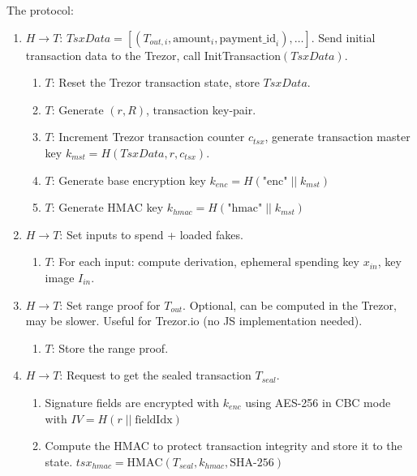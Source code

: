 \documentclass[]{article}
\begin{document}
\noindent The protocol:
\begin{enumerate}
	\item $H \rightarrow T$: $TsxData = \left[\left(T_{out,i}, \text{amount}_i, \text{payment\_id}_i\right), \dots \right]$. Send initial transaction data to the Trezor, call InitTransaction$\left(TsxData\right)$.
	
	\begin{enumerate}
		\item $T$: Reset the Trezor transaction state, store $TsxData$.
		
		\item $T$: Generate $(r, R)$, transaction key-pair.
		
		\item $T$: Increment Trezor transaction counter $c_{tsx}$, generate transaction master key $k_{mst} = H(TsxData, r, c_{tsx})$.
		
		\item $T$: Generate base encryption key $k_{enc} = H\left(\text{"enc"} \; || \; k_{mst}\right)$
		
		\item $T$: Generate HMAC key $k_{hmac} = H\left(\text{"hmac"} \; || \; k_{mst}\right)$
	\end{enumerate}
	
	\item $H \rightarrow T$: Set inputs to spend + loaded fakes.
	\begin{enumerate}
		\item $T$: For each input: compute derivation, ephemeral spending key $x_{in}$, key image $I_{in}$.
	\end{enumerate}
	
	\item $H \rightarrow T$: Set range proof for $T_{out}$. Optional, can be computed in the Trezor, may be slower. Useful for Trezor.io (no JS implementation needed).
	\begin{enumerate}
		\item $T$: Store the range proof.
	\end{enumerate}
	
	\item $H \rightarrow T$: Request to get the sealed transaction  $T_{seal}$.
	\begin{enumerate}
		\item Signature fields are encrypted with $k_{enc}$ using AES-256 in CBC mode with $IV = H(r \; || \; \text{fieldIdx})$
		
		\item Compute the HMAC to protect transaction integrity and store it to the state.
		$tsx_{hmac} = \text{HMAC}(T_{seal}, k_{hmac}, \text{SHA-256})$
	\end{enumerate} 


\end{enumerate}
\end{document}
